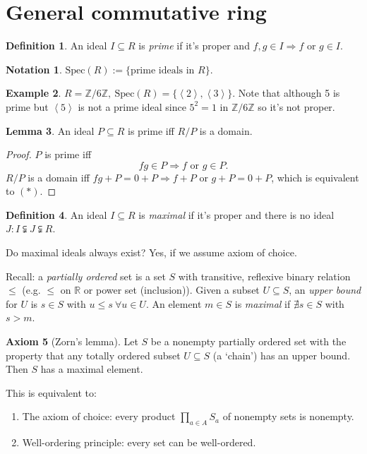 \documentclass[a4paper]{article}
\newcommand{\la}{\left\langle}
\newcommand{\ra}{\right\rangle}
\newcommand{\Z}{\mathbb Z}
\newcommand{\Spec}{\text{Spec}}
\theoremstyle{definition}
\newtheorem{defn}{Definition}[subsection]
\newtheorem{lemma}[defn]{Lemma}
\newtheorem{example}[defn]{Example}
\newtheorem{axiom}[defn]{Axiom}
\newtheorem*{notation}{Notation}
\begin{document}
\section{General commutative ring}
\begin{defn}
An ideal $I\subseteq R$ is \textit{prime} if it's proper and $f,g\in I\Rightarrow f$ or $g\in I$.
\end{defn}
\begin{notation}
$\Spec(R):=\{\text{prime ideals in }R\}$.
\end{notation}
\begin{example}
$R=\Z/6\Z,\ \Spec(R)=\{\la 2\ra,\la 3\ra\}$.  Note that although 5 is prime but $\la 5\ra$ is not a prime ideal since $5^2=1$ in $\Z/6\Z$ so it's not proper.
\end{example}
\begin{lemma}
An ideal $P\subseteq R$ is prime iff $R/P$ is a domain.
\end{lemma}
\begin{proof}
$P$ is prime iff
\[
fg\in P\Rightarrow f \text{ or } g\in P. \tag{$\ast$}
\]
$R/P$ is a domain iff $fg+P=0+P \Rightarrow f+P$ or $g+P=0+P$, which is equivalent to $(\ast)$.
\end{proof}

\begin{defn}
An ideal $I\subseteq R$ is \textit{maximal} if it's proper and there is no ideal $J:I\subsetneqq J\subsetneqq R$.
\end{defn}

Do maximal ideals always exist? Yes, if we assume axiom of choice.

Recall: a \textit{partially ordered} set is a set $S$ with transitive, reflexive binary relation $\leq$ (e.g. $\leq$ on $\mathbb R$ or power set (inclusion)). Given a subset $U\subseteq S$, an \textit{upper bound} for $U$ is $s\in S$ with $u\leq s \ \forall u\in U$. An element $m\in S$ is \textit{maximal} if $\nexists s\in S$ with $s>m$.

\begin{axiom}[Zorn's lemma]
Let $S$ be a nonempty partially ordered set with the property that any totally ordered subset $U\subseteq S$ (a `chain') has an upper bound. Then $S$ has a maximal element.
\end{axiom}

This is equivalent to:
\begin{enumerate}
\item The axiom of choice: every product $\prod_{a\in A} S_a$ of nonempty sets is nonempty.
\item Well-ordering principle: every set can be well-ordered.
\end{enumerate}
\end{document}
